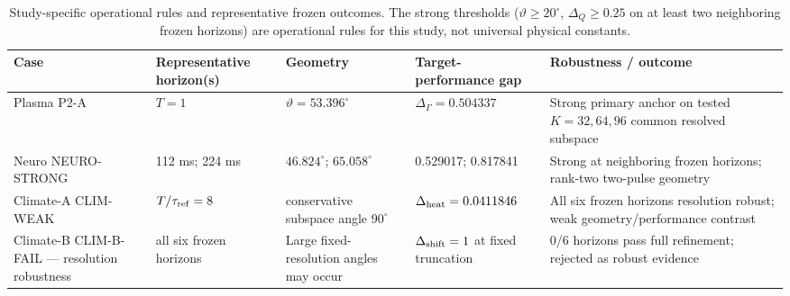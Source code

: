 \begin{table}[t]
\caption{Study-specific operational rules and representative frozen outcomes. The strong thresholds ($\vartheta\ge20^\circ$, $\Delta_Q\ge0.25$ on at least two neighboring frozen horizons) are operational rules for this study, not universal physical constants.}
\begin{tabular}{p{}p{}p{}p{}p{}}
\hline\hline
Case & Representative horizon(s) & Geometry & Target-performance gap & Robustness / outcome \\
\hline
Plasma P2-A & $T=1$ & $\vartheta=53.396^\circ$ & $\Delta_\Gamma=0.504337$ & Strong primary anchor on tested $K=32,64,96$ common resolved subspace \\
Neuro NEURO-STRONG & 112 ms; 224 ms & $46.824^\circ$; $65.058^\circ$ & 0.529017; 0.817841 & Strong at neighboring frozen horizons; rank-two two-pulse geometry \\
Climate-A CLIM-WEAK & $T/\tau_{\rm ref}=8$ & conservative subspace angle $90^\circ$ & $\Delta_{\rm heat}=0.0411846$ & All six frozen horizons resolution robust; weak geometry/performance contrast \\
Climate-B CLIM-B-FAIL --- resolution robustness & all six frozen horizons & Large fixed-resolution angles may occur & $\Delta_{\rm shift}=1$ at fixed truncation & 0/6 horizons pass full refinement; rejected as robust evidence \\
\hline\hline
\end{tabular}
\end{table}
